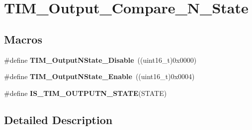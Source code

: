 \hypertarget{group___t_i_m___output___compare___n___state}{\section{T\-I\-M\-\_\-\-Output\-\_\-\-Compare\-\_\-\-N\-\_\-\-State}
\label{group___t_i_m___output___compare___n___state}
}
\subsection*{Macros}
\begin{DoxyCompactItemize}
\item 
\hypertarget{group___t_i_m___output___compare___n___state_gade8506a50fd6ba58273e9da81f6b0b54}{\#define {\bfseries T\-I\-M\-\_\-\-Output\-N\-State\-\_\-\-Disable}~((uint16\-\_\-t)0x0000)}\label{group___t_i_m___output___compare___n___state_gade8506a50fd6ba58273e9da81f6b0b54}

\item 
\hypertarget{group___t_i_m___output___compare___n___state_gac4c08f9d66ce138c6978668020526c6f}{\#define {\bfseries T\-I\-M\-\_\-\-Output\-N\-State\-\_\-\-Enable}~((uint16\-\_\-t)0x0004)}\label{group___t_i_m___output___compare___n___state_gac4c08f9d66ce138c6978668020526c6f}

\item 
\#define {\bfseries I\-S\-\_\-\-T\-I\-M\-\_\-\-O\-U\-T\-P\-U\-T\-N\-\_\-\-S\-T\-A\-T\-E}(S\-T\-A\-T\-E)
\end{DoxyCompactItemize}


\subsection{Detailed Description}


